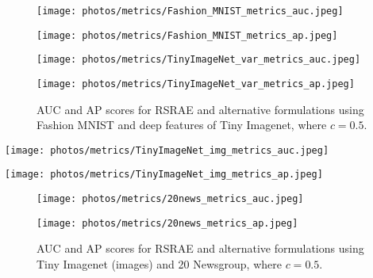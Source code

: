 \documentclass{article} \usepackage{iclr2020_conference,times}
\begin{document}
\begin{figure}[ht]

\centering
\begin{minipage}[t]{0.48\textwidth}
\centering
\texttt{[image: photos/metrics/Fashion\_MNIST\_metrics\_auc.jpeg]}
\end{minipage}
\begin{minipage}[t]{0.48\textwidth}
\centering
\texttt{[image: photos/metrics/Fashion\_MNIST\_metrics\_ap.jpeg]}
\end{minipage}


\centering
\begin{minipage}[t]{0.48\textwidth}
\centering
\texttt{[image: photos/metrics/TinyImageNet\_var\_metrics\_auc.jpeg]}
\end{minipage}
\begin{minipage}[t]{0.48\textwidth}
\centering
\texttt{[image: photos/metrics/TinyImageNet\_var\_metrics\_ap.jpeg]}
\end{minipage}

\caption{AUC and AP scores for RSRAE and alternative formulations using Fashion MNIST and deep features of Tiny Imagenet, where $c=0.5$.}
\label{fig:cprrest}
\end{figure}
    
\centering
\begin{minipage}[t]{0.48\textwidth}
\centering
\texttt{[image: photos/metrics/TinyImageNet\_img\_metrics\_auc.jpeg]}
\end{minipage}
\begin{minipage}[t]{0.48\textwidth}
\centering
\texttt{[image: photos/metrics/TinyImageNet\_img\_metrics\_ap.jpeg]}
\end{minipage}




\begin{figure}[ht]

\centering
\begin{minipage}[t]{0.48\textwidth}
\centering
\texttt{[image: photos/metrics/20news\_metrics\_auc.jpeg]}
\end{minipage}
\begin{minipage}[t]{0.48\textwidth}
\centering
\texttt{[image: photos/metrics/20news\_metrics\_ap.jpeg]}
\end{minipage}


\caption{
AUC and AP scores for RSRAE and alternative formulations using Tiny Imagenet (images) and 20 Newsgroup, where $c=0.5$.}

\label{fig:cprrest2}

\end{figure}

\vspace{10cm}
\null
\end{document}
